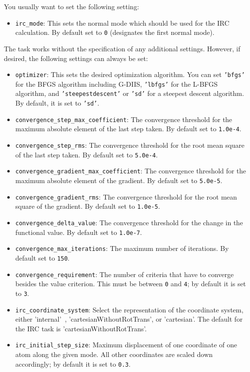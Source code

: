 \documentclass[]{tufte-book}
\begin{document}
You usually want to set the following setting:
\begin{itemize}
\item \texttt{irc\_mode}: This sets the normal mode which should be used for the IRC calculation. By default set to \texttt{0}
(designates the first normal mode).
\end{itemize}

The task works without the specification of any additional settings.
However, if desired, the following settings can always be set:
\begin{itemize}
\item \texttt{optimizer}: This sets the desired optimization algorithm. You can set \texttt{'bfgs'} for the BFGS algorithm including
G-DIIS, \texttt{'lbfgs'} for the L-BFGS algorithm, and
\texttt{'steepestdescent'} or \texttt{'sd'} for a steepest descent algorithm. By default, it is set to \texttt{'sd'}.
\item \texttt{convergence\_step\_max\_coefficient}: The convergence threshold for the maximum absolute element of the last step taken.
By default set to \texttt{1.0e-4}.
\item \texttt{convergence\_step\_rms}: The convergence threshold for the root mean square of the last step taken. By default set to
\texttt{5.0e-4}.
\item \texttt{convergence\_gradient\_max\_coefficient}: The convergence threshold for the maximum absolute element of the gradient.
By default set to \texttt{5.0e-5}.
\item \texttt{convergence\_gradient\_rms}: The convergence threshold for the root mean square of the gradient. By default set to
\texttt{1.0e-5}.
\item \texttt{convergence\_delta\_value}: The convergence threshold for the change in the functional value. By default set to
\texttt{1.0e-7}.
\item \texttt{convergence\_max\_iterations}: The maximum number of iterations. By default set to \texttt{150}.
\item \texttt{convergence\_requirement}: The number of criteria that have to converge besides the value criterion. This
must be between \texttt{0} and \texttt{4}; by default it is set to \texttt{3}.
\item \texttt{irc\_coordinate\_system}: Select the representation of the coordinate system, either 'internal'~\cite{libirc}, 'cartesianWithoutRotTrans', or 'cartesian'.
The default for the IRC task is 'cartesianWithoutRotTrans'.
\item \texttt{irc\_initial\_step\_size}: Maximum displacement of one coordinate of one atom along the given mode. All other coordinates are scaled down accordingly; by default it is set to \texttt{0.3}.

\end{itemize}
\end{document}
